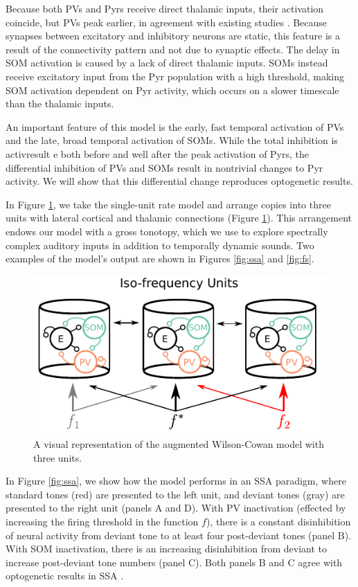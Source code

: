 \documentclass[a4paper,11pt]{article}
\begin{document}
Because both PVs and Pyrs receive direct thalamic inputs, their activation coincide, but PVs peak earlier, in agreement with existing studies \cite{keller2018gap}. Because synapses between excitatory and inhibitory neurons are static, this feature is a result of the connectivity pattern and not due to synaptic effects. The delay in SOM activation is caused by a lack of direct thalamic inputs. SOMs instead receive excitatory input from the Pyr population with a high threshold, making SOM activation dependent on Pyr activity, which occurs on a slower timescale than the thalamic inputs.

An important feature of this model is the early, fast temporal activation of PVs and the late, broad temporal activation of SOMs. While the total inhibition is activresult e both before and well after the peak activation of Pyrs, the differential inhibition of PVs and SOMs result in nontrivial changes to Pyr activity. We will show that this differential change reproduces optogenetic results.

In Figure \ref{fig:wc_space}, we take the single-unit rate model and arrange copies into three units with lateral cortical and thalamic connections (Figure \ref{fig:wc_space}). This arrangement endows our model with a gross tonotopy, which we  use to explore spectrally complex auditory inputs in addition to temporally dynamic sounds. Two examples of the model's output are shown in Figures \ref{fig:ssa} and \ref{fig:fs}.

\begin{figure}[ht!]
\centering
\includegraphics[width=.75\textwidth]{col3.pdf}
\caption{A visual representation of the augmented Wilson-Cowan model with three units.}\label{fig:wc_space}
\end{figure}

In Figure \ref{fig:ssa}, we show how the model performs in an SSA paradigm, where standard tones (red) are presented to the left unit, and deviant tones (gray) are presented to the right unit (panels A and D). With PV inactivation (effected by increasing the firing threshold in the function $f$), there is a constant disinhibition of neural activity from deviant tone to at least four post-deviant tones (panel B). With SOM inactivation, there is an increasing disinhibition from deviant to increase post-deviant tone numbers (panel C). Both panels B and C agree with optogenetic results in SSA \cite{natan2015complementary}.
\end{document}
